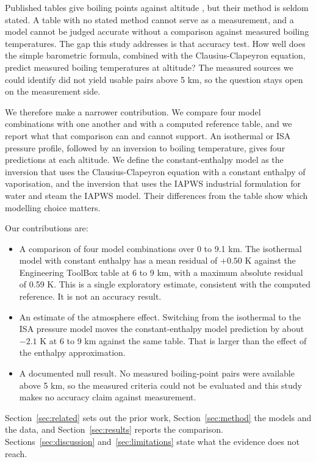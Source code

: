 \documentclass[11pt,letterpaper]{article}
\begin{document}
Published tables give boiling points against altitude \cite{EngineeringToolBox}, but their method is seldom stated. A table with no stated method cannot serve as a measurement, and a model cannot be judged accurate without a comparison against measured boiling temperatures. The gap this study addresses is that accuracy test. How well does the simple barometric formula, combined with the Clausius-Clapeyron equation, predict measured boiling temperatures at altitude? The measured sources we could identify did not yield usable pairs above 5 km, so the question stays open on the measurement side.

We therefore make a narrower contribution. We compare four model combinations with one another and with a computed reference table, and we report what that comparison can and cannot support. An isothermal or ISA pressure profile, followed by an inversion to boiling temperature, gives four predictions at each altitude. We define the constant-enthalpy model as the inversion that uses the Clausius-Clapeyron equation with a constant enthalpy of vaporisation, and the inversion that uses the IAPWS industrial formulation for water and steam the IAPWS model. Their differences from the table show which modelling choice matters.

Our contributions are:
\begin{itemize}
  \item A comparison of four model combinations over 0 to 9.1 km. The isothermal model with constant enthalpy has a mean residual of $+0.50$ K against the Engineering ToolBox table at 6 to 9 km, with a maximum absolute residual of 0.59 K. This is a single exploratory estimate, consistent with the computed reference. It is not an accuracy result.
  \item An estimate of the atmosphere effect. Switching from the isothermal to the ISA pressure model moves the constant-enthalpy model prediction by about $-2.1$ K at 6 to 9 km against the same table. That is larger than the effect of the enthalpy approximation.
  \item A documented null result. No measured boiling-point pairs were available above 5 km, so the measured criteria could not be evaluated and this study makes no accuracy claim against measurement.
\end{itemize}

Section~\ref{sec:related} sets out the prior work, Section~\ref{sec:method} the models and the data, and Section~\ref{sec:results} reports the comparison. Sections~\ref{sec:discussion} and~\ref{sec:limitations} state what the evidence does not reach.
\end{document}
